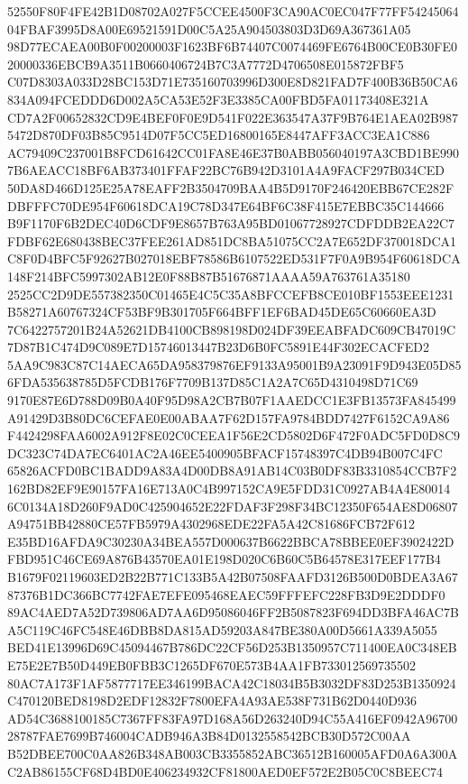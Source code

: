 \documentclass[UTF8,fontset=fandol,zihao=-4,a4paper]{ctexart}
\begin{document}
{{52550F80F4FE42B1D08702A027F5CCEE4500F3CA90AC0EC047F77FF5424506404FBAF3995D8A00E69521591D00C5A25A904503803D3D69A367361A05
98D77ECAEA00B0F00200003F1623BF6B74407C0074469FE6764B00CE0B30FE020000336EBCB9A3511B0660406724B7C3A7772D4706508E015872FBF5
C07D8303A033D28BC153D71E735160703996D300E8D821FAD7F400B36B50CA6834A094FCEDDD6D002A5CA53E52F3E3385CA00FBD5FA01173408E321A
CD7A2F00652832CD9E4BEF0F0E9D541F022E363547A37F9B764E1AEA02B9875472D870DF03B85C9514D07F5CC5ED16800165E8447AFF3ACC3EA1C886
AC79409C237001B8FCD61642CC01FA8E46E37B0ABB056040197A3CBD1BE9907B6AEACC18BF6AB373401FFAF22BC76B942D3101A4A9FACF297B034CED
50DA8D466D125E25A78EAFF2B3504709BAA4B5D9170F246420EBB67CE282FDBFFFC70DE954F60618DCA19C78D347E64BF6C38F415E7EBBC35C144666
B9F1170F6B2DEC40D6CDF9E8657B763A95BD01067728927CDFDDB2EA22C7FDBF62E680438BEC37FEE261AD851DC8BA51075CC2A7E652DF370018DCA1
C8F0D4BFC5F92627B027018EBF78586B6107522ED531F7F0A9B954F60618DCA148F214BFC5997302AB12E0F88B87B51676871AAAA59A763761A35180
2525CC2D9DE557382350C01465E4C5C35A8BFCCEFB8CE010BF1553EEE1231B58271A60767324CF53BF9B301705F664BFF1EF6BAD45DE65C60660EA3D
7C6422757201B24A52621DB4100CB898198D024DF39EEABFADC609CB47019C7D87B1C474D9C089E7D15746013447B23D6B0FC5891E44F302ECACFED2
5AA9C983C87C14AECA65DA958379876EF9133A95001B9A23091F9D943E05D856FDA535638785D5FCDB176F7709B137D85C1A2A7C65D4310498D71C69
9170E87E6D788D09B0A40F95D98A2CB7B07F1AAEDCC1E3FB13573FA845499A91429D3B80DC6CEFAE0E00ABAA7F62D157FA9784BDD7427F6152CA9A86
F4424298FAA6002A912F8E02C0CEEA1F56E2CD5802D6F472F0ADC5FD0D8C9DC323C74DA7EC6401AC2A46EE5400905BFACF15748397C4DB94B007C4FC
65826ACFD0BC1BADD9A83A4D00DB8A91AB14C03B0DF83B3310854CCB7F2162BD82EF9E90157FA16E713A0C4B997152CA9E5FDD31C0927AB4A4E80014
6C0134A18D260F9AD0C425904652E22FDAF3F298F34BC12350F654AE8D06807A94751BB42880CE57FB5979A4302968EDE22FA5A42C81686FCB72F612
E35BD16AFDA9C30230A34BEA557D000637B6622BBCA78BBEE0EF3902422DFBD951C46CE69A876B43570EA01E198D020C6B60C5B64578E317EEF177B4
B1679F02119603ED2B22B771C133B5A42B07508FAAFD3126B500D0BDEA3A6787376B1DC366BC7742FAE7EFE095468EAEC59FFFEFC228FB3D9E2DDDF0
89AC4AED7A52D739806AD7AA6D95086046FF2B5087823F694DD3BFA46AC7BA5C119C46FC548E46DBB8DA815AD59203A847BE380A00D5661A339A5055
BED41E13996D69C45094467B786DC22CF56D253B1350957C711400EA0C348EBE75E2E7B50D449EB0FBB3C1265DF670E573B4AA1FB733012569735502
80AC7A173F1AF5877717EE346199BACA42C18034B5B3032DF83D253B1350924C470120BED8198D2EDF12832F7800EFA4A93AE538F731B62D0440D936
AD54C3688100185C7367FF83FA97D168A56D263240D94C55A416EF0942A9670028787FAE7699B746004CADB946A3B84D0132558542BCB30D572C00AA
B52DBEE700C0AA826B348AB003CB3355852ABC36512B160005AFD0A6A300AC2AB86155CF68D4BD0E406234932CF81800AED0EF572E2B05C0C8BEEC74
}}
\end{document}
